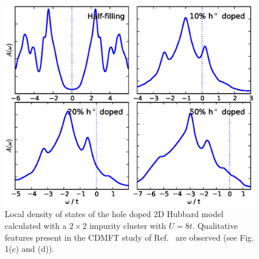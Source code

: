 \documentclass[aps,twocolumn,nobibnotes]{revtex4}
\begin{document}
\begin{figure}
\begin{center}
    \vspace{-2mm}
\includegraphics[scale=0.425]{Plots/Doping/2D/nImp4/U8/LargerBroadening/2DHub_Doping.eps}
\end{center}
    \vspace{-8mm}
\caption{Local density of states of the hole doped 2D Hubbard model calculated with a $2 \times 2$ impurity cluster with $U = 8t$. Qualitative
features present in the CDMFT study of Ref.~ are observed (see Fig. 1(c) and (d)).}
\label{2D_Doped}
\end{figure}
\end{document}
